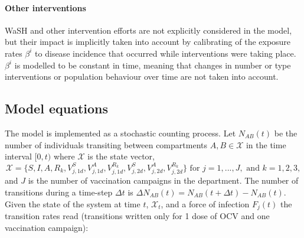 \paragraph{Other interventions} WaSH and other intervention efforts are not explicitly considered in the model, but their impact is implicitly taken into account by calibrating of the exposure rates $\beta^i$ to disease incidence that occurred while interventions were taking place. $\beta^i$ is modelled to be constant in time, meaning that changes in number or type interventions or population behaviour over time are not taken into account\cite{Bertuzzo:ProbabilityExtinctionHaiti:2016}. %


\subsection{Model equations}\label{sec:stoch}
The model is implemented as a stochastic counting process\cite{Breto:TimeSeriesAnalysis:2009}. Let \(N_{AB}(t)\) be the number of individuals transiting between compartments \(A,B\in \mathcal{X}\) in the time interval \([0,t)\)  where $\mathcal{X}$ is the state vector,
$$\mathcal{X} = \{S, I, A, R_k, V^S_{j,1d},V^A_{j,1d}, V^{R_k}_{j,1d}, V^S_{j,2d},V^A_{j,2d}, V^{R_k}_{j,2d}\} 
\text{ for } j = 1, ..., J, \text{ and } k = 1, 2, 3,
$$
and $J$ is the number of vaccination campaigns in the department.
The number of transitions during a time-step $\Delta t$ is
\(\Delta N_{AB}(t) = N_{AB}(t+\Delta t) - N_{AB}(t)\). Given the state of the system at time \(t\), \(\mathcal{X}_t\), and a force of infection $F_j(t)$ the transition rates read (transitions written only for 1 dose of OCV and one vaccination campaign):
